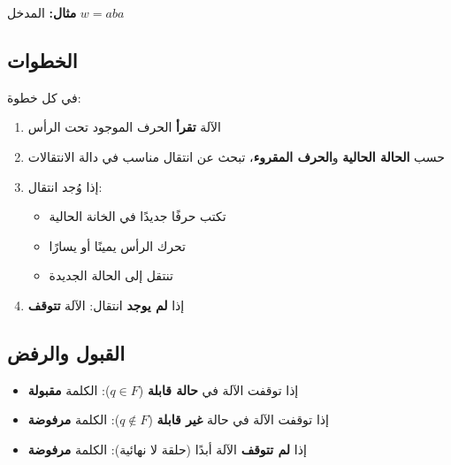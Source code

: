 \documentclass[14pt]{extarticle}
\begin{document}
\textbf{مثال:} المدخل $w = aba$
\begin{center}
\end{center}

\subsection{الخطوات}

في كل خطوة:
\begin{enumerate}
    \item الآلة \textbf{تقرأ} الحرف الموجود تحت الرأس
    \item حسب \textbf{الحالة الحالية} و\textbf{الحرف المقروء}، تبحث عن انتقال مناسب في دالة الانتقالات
    \item إذا وُجد انتقال:
    \begin{itemize}
        \item تكتب حرفًا جديدًا في الخانة الحالية
        \item تحرك الرأس يمينًا أو يسارًا
        \item تنتقل إلى الحالة الجديدة
    \end{itemize}
    \item إذا \textbf{لم يوجد} انتقال: الآلة \textbf{تتوقف}
\end{enumerate}

\subsection{القبول والرفض}

\begin{itemize}
    \item إذا توقفت الآلة في \textbf{حالة قابلة} ($q \in F$): الكلمة \textbf{مقبولة}
    \item إذا توقفت الآلة في حالة \textbf{غير قابلة} ($q \notin F$): الكلمة \textbf{مرفوضة}
    \item إذا \textbf{لم تتوقف} الآلة أبدًا (حلقة لا نهائية): الكلمة \textbf{مرفوضة}
\end{itemize}
\end{document}
